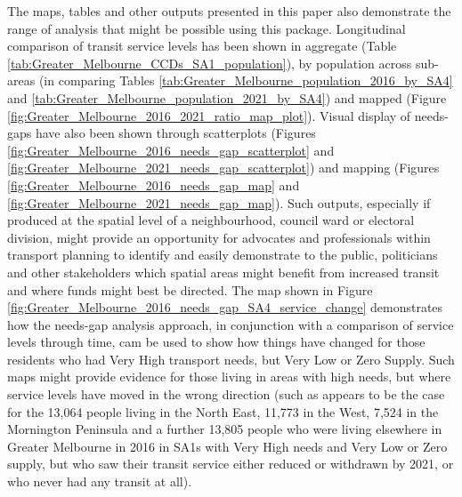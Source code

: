 \documentclass[preprint, 3p,
authoryear]{elsarticle} %
\begin{document}
The maps, tables and other outputs presented in this paper also
demonstrate the range of analysis that might be possible using this
package. Longitudinal comparison of transit service levels has been
shown in aggregate (Table
\ref{tab:Greater_Melbourne_CCDs_SA1_population}), by population across
sub-areas (in comparing Tables
\ref{tab:Greater_Melbourne_population_2016_by_SA4} and
\ref{tab:Greater_Melbourne_population_2021_by_SA4}) and mapped (Figure
\ref{fig:Greater_Melbourne_2016_2021_ratio_map_plot}). Visual display of
needs-gaps have also been shown through scatterplots (Figures
\ref{fig:Greater_Melbourne_2016_needs_gap_scatterplot} and
\ref{fig:Greater_Melbourne_2021_needs_gap_scatterplot}) and mapping
(Figures \ref{fig:Greater_Melbourne_2016_needs_gap_map} and
\ref{fig:Greater_Melbourne_2021_needs_gap_map}). Such outputs,
especially if produced at the spatial level of a neighbourhood, council
ward or electoral division, might provide an opportunity for advocates
and professionals within transport planning to identify and easily
demonstrate to the public, politicians and other stakeholders which
spatial areas might benefit from increased transit and where funds might
best be directed. The map shown in Figure
\ref{fig:Greater_Melbourne_2016_needs_gap_SA4_service_change}
demonstrates how the needs-gap analysis approach, in conjunction with a
comparison of service levels through time, cam be used to show how
things have changed for those residents who had Very High transport
needs, but Very Low or Zero Supply. Such maps might provide evidence for
those living in areas with high needs, but where service levels have
moved in the wrong direction (such as appears to be the case for the
13,064 people living in the North East, 11,773 in the West, 7,524 in the
Mornington Peninsula and a further 13,805 people who were living
elsewhere in Greater Melbourne in 2016 in SA1s with Very High needs and
Very Low or Zero supply, but who saw their transit service either
reduced or withdrawn by 2021, or who never had any transit at all).
\end{document}
